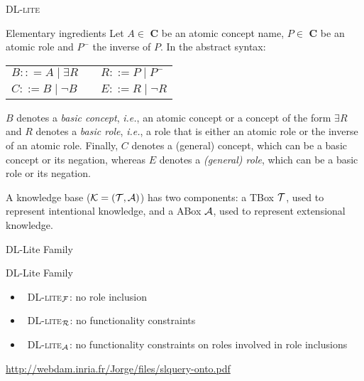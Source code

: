 \documentclass{beamer}
\def\A{\hbox{${\cal{A}}$}}
\def\K{\hbox{${\cal{K}}$}}
\def\T{\hbox{${\cal{T}}$}}
\def\dl{\hbox{\textsc{DL-lite}}\xspace}
\def\dla{\hbox{\textsc{DL-lite}$_{\cal A}$}\xspace}
\def\dlf{\hbox{\textsc{DL-lite}$_{\cal F}$}\xspace}
\def\dlr{\hbox{\textsc{DL-lite}$_{\cal R}$}\xspace}
\def\ie{\textit{i.e.}}
\begin{document}
 
 \begin{frame}{\dl}
 
 \begin{block}{Elementary ingredients}
 Let $A \in$   \textbf{C} be an atomic concept name, 
$P \in $ \textbf{C} be an atomic role and $P^-$ the inverse of  $P$.
In  the abstract syntax:

\begin{center}
\begin{tabular}{lcl}
$ B :: =  A \mid \exists R$ 	&\hspace{1cm}		&$ R ::= P \mid P^-$\\
$C ::= B \mid \neg B$ 		& 							&$ E ::= R \mid \neg R$ \\
\end{tabular}
\end{center}

\noindent
 $B$ denotes a \textit{basic concept}, \ie,  an atomic concept or a concept of 
 the form $\exists R$ and $R$ denotes a \textit{basic role}, \ie, a role that is either an 
 atomic role or the inverse of an atomic role. 
  Finally, $C$ denotes a \textit{}(general) concept, which can be a basic concept or its negation, 
  whereas $E$ denotes a \textit{(general) role}, which can be a basic role or its negation.
  
  \vspace{1cm}
  A  knowledge base ($\K = (\T,\A)$)  has two components: a TBox $\T$, used to represent intentional knowledge, and a ABox $\A$, used
to represent  extensional knowledge.
  \end{block}
 \end{frame}
 
 \begin{frame}{DL-Lite Family}
 
 \begin{block}{DL-Lite Family}
 \begin{itemize}
 \item ~\dlf: no role inclusion
 \item ~\dlr: no functionality constraints
 \item ~\dla: no functionality constraints on roles involved in role inclusions
 \end{itemize}
 
 \end{block}
 
 \url{http://webdam.inria.fr/Jorge/files/slquery-onto.pdf}
 \end{frame}
 
\end{document}
